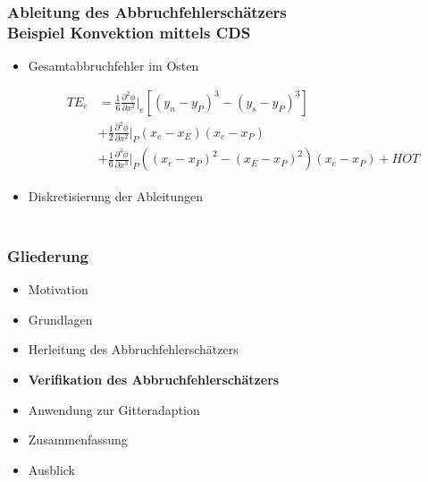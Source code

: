 \documentclass[accentcolor=tud2c,colorbacktitle,inverttitle,landscape,ngerman,presentation,t]{tudbeamer}
\begin{document}
\begin{frame}
  \frametitle{Ableitung des Abbruchfehlerschätzers\\
  Beispiel Konvektion mittels CDS}
    \begin{itemize}
      \item Gesamtabbruchfehler im Osten

\begin{align*}
  TE_{e} &=
  \frac{1}{6} \frac{\partial^2\phi}{\partial x^2}\bigg\vert_e
    \left[{{(y_n-y_P)}^3-{(y_s-y_P)}^3}\right]\\
    &+ \frac{1}{2}  \frac{\partial^2\phi}{\partial x^2}\bigg\vert_P (x_e-x_E)(x_e-x_P)\\&+ \frac{1}{6}
   \frac{\partial^3\phi}{\partial x^3}\bigg\vert_P \left({(x_e-x_P)^2-(x_E-x_P)^2}\right)(x_e-x_P)+HOT
\end{align*}
\item Diskretisierung der Ableitungen
    \end{itemize}
\end{frame}






\begin{frame}
  \frametitle{\\Gliederung}
  \begin{itemize}
  \item Motivation
  \item Grundlagen
  \item Herleitung des Abbruchfehlerschätzers
  \item \textbf{Verifikation des Abbruchfehlerschätzers}
  \item Anwendung zur Gitteradaption
  \item Zusammenfassung
  \item Ausblick
  \end{itemize}
\end{frame}
\end{document}

